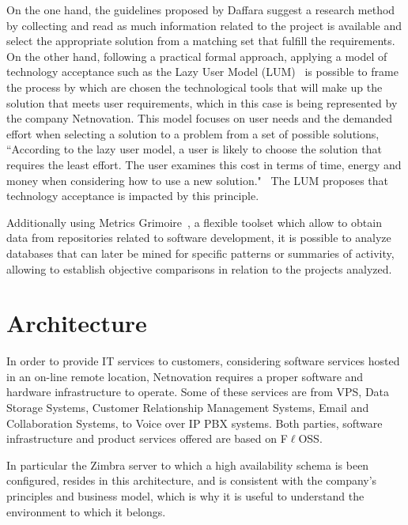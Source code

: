 \documentclass[a4paper, 12pt]{book}
\begin{document}
\noindent On the one hand, the guidelines proposed by Daffara suggest a research method by collecting and read as much information related to the project is available and select the appropriate solution from a matching set that fulfill the requirements. On the other hand, following a practical formal approach, applying a model of technology acceptance such as the Lazy User Model (LUM)~\cite{CandT1} is possible to frame the process by which are chosen the technological tools that will make up the solution that meets user requirements, which in this case is being represented by the company Netnovation. This model focuses on user needs and the demanded effort when selecting a solution to a problem from a set of possible solutions, ``According to the lazy user model, a user is likely to choose the solution that requires the least effort. The user examines this cost in terms of time, energy and money when considering how to use a new solution."~\cite{CandT2} The LUM proposes that technology acceptance is impacted by this principle.\bigskip

\noindent Additionally using Metrics Grimoire~\cite{GSyC}, a flexible toolset which allow to obtain data from repositories related to software development, it is possible to analyze databases that can later be mined for specific patterns or summaries of activity, allowing to establish objective comparisons in relation to the projects analyzed.


%
\chapter{Architecture}
\label{chap:architecture}

In order to provide IT services to customers, considering software services hosted in an on-line remote location, Netnovation requires a proper software and hardware infrastructure to operate. Some of these services are from VPS, Data Storage Systems, Customer Relationship Management Systems, Email and Collaboration Systems, to Voice over IP PBX systems. Both parties, software infrastructure and product services offered are based on F$\ell$OSS.\bigskip

\noindent In particular the Zimbra server to which a high availability schema is been configured, resides in this architecture, and is consistent with the company's principles and business model, which is why it is useful to understand the environment to which it belongs.
\end{document}
